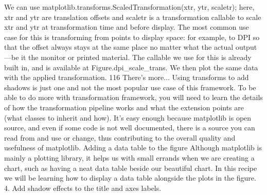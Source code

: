 We can use matplotlib.transforms.ScaledTransformation(xtr, ytr,
scaletr); here, xtr and ytr are translation offsets and scaletr is a transformation
callable to scale xtr and ytr at transformation time and before display. The most common
use case for this is transforming from points to display space: for example, to DPI so that the
offset always stays at the same place no matter what the actual output—be it the monitor
or printed material. The callable we use for this is already built in, and is available at
Figure.dpi_scale_trans.
We then plot the same data with the applied transformation.
\newpage %
116
There's more...
Using transforms to add shadows is just one and not the most popular use case of this
framework. To be able to do more with transformation framework, you will need to learn the
details of how the transformation pipeline works and what the extension points are (what
classes to inherit and how). It's easy enough because matplotlib is open source, and even if
some code is not well documented, there is a source you can read from and use or change,
thus contributing to the overall quality and usefulness of matplotlib.
Adding a data table to the figure
Although matplotlib is mainly a plotting library, it helps us with small errands when we are
creating a chart, such as having a neat data table beside our beautiful chart. In this recipe
we will be learning how to display a data table alongside the plots in the figure.
4. Add shadow effects to the title and axes labels.
